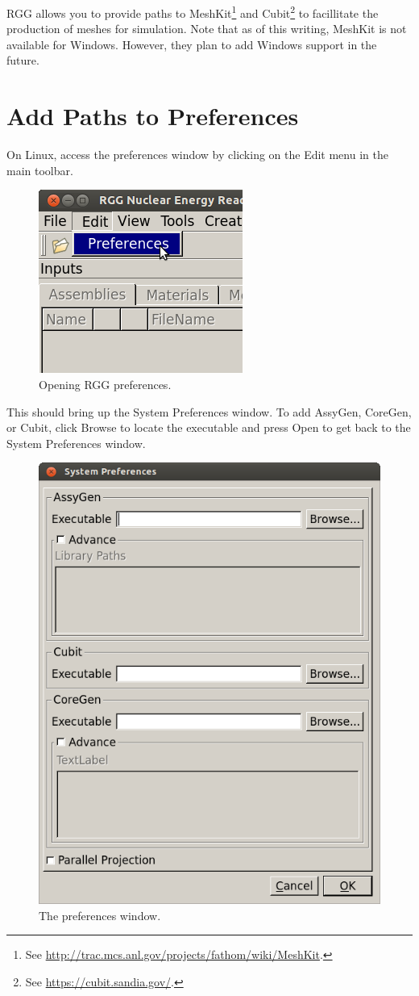 RGG allows you to provide paths to MeshKit\footnote{See \url{http://trac.mcs.anl.gov/projects/fathom/wiki/MeshKit}.} and Cubit\footnote{See \url{https://cubit.sandia.gov/}.} to facillitate the production of meshes for simulation.  Note that as of this writing, MeshKit is not available for Windows.  However, they plan to add Windows support in the future.

\section{Add Paths to Preferences}

On Linux, access the preferences window by clicking on the Edit menu in the main toolbar.

\begin{figure}[H]
	\begin{center}
		\includegraphics[width=0.5\linewidth]{Images/mesh-1.png}
		\caption{Opening RGG preferences.}
		\label{fig:Mesh1}
	\end{center}
\end{figure}

This should bring up the System Preferences window.  To add AssyGen, CoreGen, or Cubit, click Browse to locate the executable and press Open to get back to the System Preferences window.

\begin{figure}[H]
	\begin{center}
		\includegraphics[width=0.5\linewidth]{Images/mesh-2.png}
		\caption{The preferences window.}
		\label{fig:Mesh2}
	\end{center}
\end{figure}

